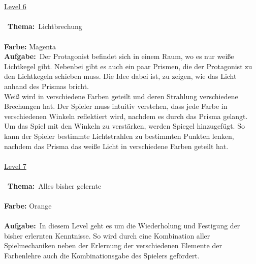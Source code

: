 \documentclass[10pt,a4paper,notitlepage]{report}
\begin{document}
	\\\\
	\underline{Level 6}\\\\\
	\textbf{Thema:}\
	Lichtbrechung
	\\\\
	\textbf{Farbe:} Magenta\
	\
	\\
	\textbf{Aufgabe:}\
	Der Protagonist befindet sich in einem Raum, wo es nur weiße Lichtkegel gibt. Nebenbei gibt es auch ein paar Prismen, die der Protagonist zu den Lichtkegeln 		schieben muss. Die Idee dabei ist, zu zeigen, wie das Licht anhand des Prismas bricht.\\
	Weiß wird in verschiedene Farben geteilt und deren Strahlung verschiedene Brechungen hat. Der Spieler muss intuitiv verstehen, dass jede Farbe in 			verschiedenen Winkeln reflektiert wird, nachdem es durch das Prisma gelangt.\\
	Um das Spiel mit den Winkeln zu verstärken, werden Spiegel hinzugefügt. So kann der Spieler bestimmte Lichtstrahlen zu bestimmten Punkten lenken, 
	nachdem das Prisma das weiße Licht in verschiedene Farben geteilt hat.
	\\\\
	\underline{Level 7}\\\\\
	\textbf{Thema:}\
	Alles bisher gelernte
	\\\\
	\textbf{Farbe:} Orange\
	\\\\
	\textbf{Aufgabe:}\
	In diesem Level geht es um die Wiederholung und Festigung der bisher erlernten Kenntnisse. So wird durch eine Kombination 			aller Spielmechaniken neben der Erlernung der verschiedenen Elemente der Farbenlehre auch die Kombinationsgabe des 			Spielers gefördert.
	\\
	\clearpage\
	\marginpar{\vspace{3.0mm} \color{orange}\rule{0.8mm}{53.3mm} \\[3mm] \color{hellorange}\rule{0.8mm}{170mm}}
\end{document}
